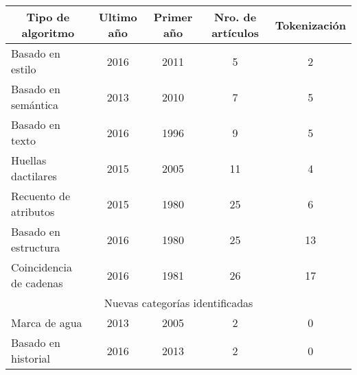 \begin{table}[H]
\centering
\begin{tabular}{|lllll|}
\hline
\multicolumn{1}{|c|}{Tipo de algoritmo}       & \multicolumn{1}{c|}{Ultimo año} & \multicolumn{1}{c|}{Primer año} & \multicolumn{1}{c|}{Nro. de artículos} & \multicolumn{1}{c|}{Tokenización} \\ \hline\hline
\multicolumn{1}{|l|}{Basado en estilo}        & \multicolumn{1}{c|}{2016}       & \multicolumn{1}{c|}{2011}       & \multicolumn{1}{c|}{5}                 & \multicolumn{1}{c|}{2}           \\ \hline
\multicolumn{1}{|l|}{Basado en semántica}     & \multicolumn{1}{c|}{2013}       & \multicolumn{1}{c|}{2010}       & \multicolumn{1}{c|}{7}                 & \multicolumn{1}{c|}{5}            \\ \hline
\multicolumn{1}{|l|}{Basado en texto}         & \multicolumn{1}{c|}{2016}       & \multicolumn{1}{c|}{1996}       & \multicolumn{1}{c|}{9}                 & \multicolumn{1}{c|}{5}           \\ \hline
\multicolumn{1}{|l|}{Huellas dactilares}      & \multicolumn{1}{c|}{2015}       & \multicolumn{1}{c|}{2005}       & \multicolumn{1}{c|}{11}                & \multicolumn{1}{c|}{4}            \\ \hline
\multicolumn{1}{|l|}{Recuento de atributos}   & \multicolumn{1}{c|}{2015}       & \multicolumn{1}{c|}{1980}       & \multicolumn{1}{c|}{25}                & \multicolumn{1}{c|}{6}            \\ \hline
\multicolumn{1}{|l|}{Basado en estructura}    & \multicolumn{1}{c|}{2016}       & \multicolumn{1}{c|}{1980}       & \multicolumn{1}{c|}{25}                & \multicolumn{1}{c|}{13}           \\ \hline
\multicolumn{1}{|l|}{Coincidencia de cadenas} & \multicolumn{1}{c|}{2016}       & \multicolumn{1}{c|}{1981}       & \multicolumn{1}{c|}{26}                & \multicolumn{1}{c|}{17}           \\ \hline\hline
\multicolumn{5}{|c|}{Nuevas categorías identificadas}                                                                                                                    \\ \hline\hline
\multicolumn{1}{|l|}{Marca de agua}           & \multicolumn{1}{c|}{2013}       & \multicolumn{1}{c|}{2005}       & \multicolumn{1}{c|}{2}                 & \multicolumn{1}{c|}{0}            \\ \hline
\multicolumn{1}{|l|}{Basado en historial}     & \multicolumn{1}{c|}{2016}       & \multicolumn{1}{c|}{2013}       & \multicolumn{1}{c|}{2}                 & \multicolumn{1}{c|}{0}            \\ \hline

\end{tabular}
\end{table}
